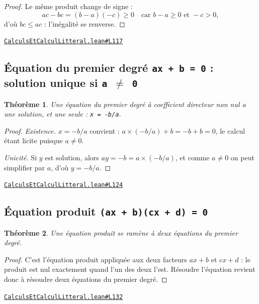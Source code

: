 \documentclass[11pt,a4paper]{article}
\theoremstyle{definition}
\theoremstyle{plain}
\newtheorem{theoreme}{Théorème}
\newcommand{\source}[2]{\par\smallskip\noindent\hfill{\footnotesize\href{#1}{\texttt{#2}}}\par\smallskip}
\begin{document}
\begin{proof}
Le même produit change de signe :
\[
ac - bc = (b - a)(-c) \ge 0 \quad\text{car } b - a \ge 0 \text{ et } -c > 0 ,
\]
d'où $bc \le ac$ : l'inégalité se renverse.
\end{proof}
\source{https://github.com/Commutator-IO/learn-lean/blob/main/courses/01-college/01-nombres-et-calculs/CalculsEtCalculLitteral.lean\#L117}{CalculsEtCalculLitteral.lean\#L117}

\subsection{Équation du premier degré \texttt{ax + b = 0} : solution unique si \texttt{a \(\ne\) 0}}

\begin{theoreme}
Une équation du premier degré à coefficient directeur non nul a une solution, et une
seule : \texttt{x = -b/a}.
\end{theoreme}

\begin{proof}
\emph{Existence.} $x = -b/a$ convient : $a \times (-b/a) + b = -b + b = 0$, le calcul
étant licite puisque $a \ne 0$.

\emph{Unicité.} Si $y$ est solution, alors $ay = -b = a \times (-b/a)$, et comme $a \ne 0$
on peut simplifier par $a$, d'où $y = -b/a$.
\end{proof}
\source{https://github.com/Commutator-IO/learn-lean/blob/main/courses/01-college/01-nombres-et-calculs/CalculsEtCalculLitteral.lean\#L124}{CalculsEtCalculLitteral.lean\#L124}

\subsection{Équation produit \texttt{(ax + b)(cx + d) = 0}}

\begin{theoreme}
Une équation produit se ramène à deux équations du premier degré.
\end{theoreme}

\begin{proof}
C'est l'équation produit appliquée aux deux facteurs $ax + b$ et $cx + d$ : le
produit est nul exactement quand l'un des deux l'est. Résoudre l'équation revient donc à
résoudre deux équations du premier degré.
\end{proof}
\source{https://github.com/Commutator-IO/learn-lean/blob/main/courses/01-college/01-nombres-et-calculs/CalculsEtCalculLitteral.lean\#L132}{CalculsEtCalculLitteral.lean\#L132}
\end{document}
